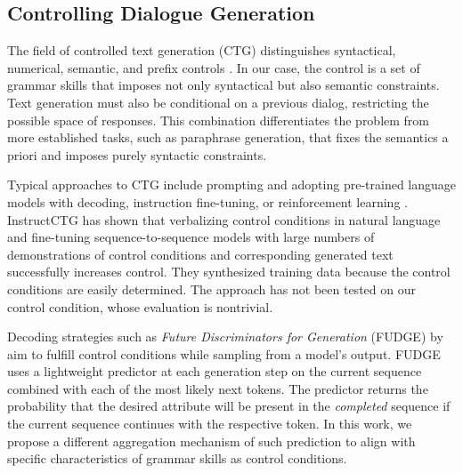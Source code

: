 \subsection{Controlling Dialogue Generation}
The field of controlled text generation (CTG) distinguishes syntactical, numerical, semantic, and prefix controls \citep{sunEvaluatingLargeLanguage2023}. In our case, the control is a set of grammar skills that imposes not only syntactical but also semantic constraints. Text generation must also be conditional on a previous dialog, restricting the possible space of responses. This combination differentiates the problem from more established tasks, such as paraphrase generation, that fixes the semantics a priori and imposes purely syntactic constraints. 

Typical approaches to CTG include prompting and adopting pre-trained language models with decoding, instruction fine-tuning, or reinforcement learning \citep{zhangSurveyControllableText2023}. %
InstructCTG \citep{zhouControlledTextGeneration2023} has shown that verbalizing control conditions in natural language and fine-tuning sequence-to-sequence models with large numbers of demonstrations of control conditions and corresponding generated text successfully increases control. They synthesized training data because the control conditions are easily determined. The approach has not been tested on our control condition, whose evaluation is nontrivial.

Decoding strategies such as \textit{Future Discriminators for Generation} (FUDGE) by \citet{yangFUDGEControlledText2021} aim to fulfill control conditions while sampling from a model's output. FUDGE uses a lightweight predictor at each generation step on the current sequence combined with each of the most likely next tokens. The predictor returns the probability that the desired attribute will be present in the \textit{completed} sequence if the current sequence continues with the respective token. In this work, we propose a different aggregation mechanism of such prediction to align with specific characteristics of grammar skills as control conditions.